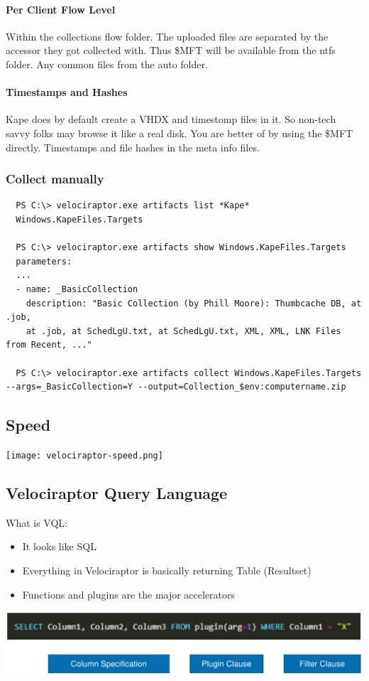 \paragraph{Per Client Flow Level}
Within the collections flow folder. The uploaded files are separated by the accessor they got collected with. Thus \$MFT will be available from the ntfs folder. Any common files from the auto folder.

\paragraph{Timestamps and Hashes}
Kape does by default create a VHDX and timestomp files in it. 
So non-tech savvy folks may browse it like a real disk. 
You are better of by using the \$MFT directly.
Timestamps and file hashes in the meta info files.

\subsubsection{Collect manually}
\begin{lstlisting}
  PS C:\> velociraptor.exe artifacts list *Kape*
  Windows.KapeFiles.Targets

  PS C:\> velociraptor.exe artifacts show Windows.KapeFiles.Targets
  parameters:
  ...
  - name: _BasicCollection
    description: "Basic Collection (by Phill Moore): Thumbcache DB, at .job,
    at .job, at SchedLgU.txt, at SchedLgU.txt, XML, XML, LNK Files from Recent, ..."

  PS C:\> velociraptor.exe artifacts collect Windows.KapeFiles.Targets --args=_BasicCollection=Y --output=Collection_$env:computername.zip
\end{lstlisting}

\subsection{Speed}
\texttt{[image: velociraptor-speed.png]}

\subsection{Velociraptor Query Language}
What is VQL:
\begin{itemize}
    \item It looks like SQL
    \item Everything in Velociraptor is basically returning Table (Resultset)
    \item Functions and plugins are the major accelerators
\end{itemize}
\includegraphics[width=\linewidth]{./img/10-velociraptor/vql.png}

